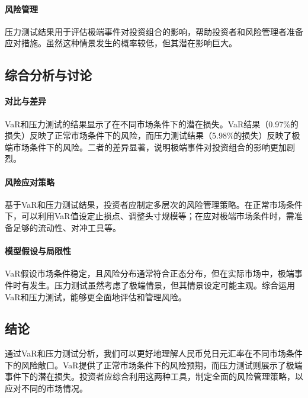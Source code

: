 \paragraph{风险管理}压力测试结果用于评估极端事件对投资组合的影响，帮助投资者和风险管理者准备应对措施。虽然这种情景发生的概率较低，但其潜在影响巨大。

\subsection{综合分析与讨论}
\paragraph{对比与差异}VaR和压力测试的结果显示了在不同市场条件下的潜在损失。VaR结果（0.97\%的损失）反映了正常市场条件下的风险，而压力测试结果（5.98\%的损失）反映了极端市场条件下的风险。二者的差异显著，说明极端事件对投资组合的影响更加剧烈。
\paragraph{风险应对策略}基于VaR和压力测试结果，投资者应制定多层次的风险管理策略。在正常市场条件下，可以利用VaR值设定止损点、调整头寸规模等；在应对极端市场条件时，需准备足够的流动性、对冲工具等。
\paragraph{模型假设与局限性}VaR假设市场条件稳定，且风险分布通常符合正态分布，但在实际市场中，极端事件时有发生。压力测试虽然考虑了极端情景，但其情景设定可能主观。综合运用VaR和压力测试，能够更全面地评估和管理风险。

\subsection{结论}
通过VaR和压力测试分析，我们可以更好地理解人民币兑日元汇率在不同市场条件下的风险敞口。VaR提供了正常市场条件下的风险预期，而压力测试则展示了极端事件下的潜在损失。投资者应综合利用这两种工具，制定全面的风险管理策略，以应对不同的市场情况。
